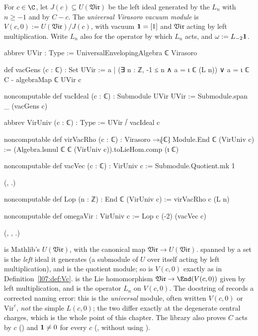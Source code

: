 \begin{definition}\label{l07:def:Vc}
For $c\in\C$, let $J(c)\subseteq U(\mathfrak{Vir})$ be the left ideal generated by the $L_n$ with
$n\ge-1$ and by $C-c$. The \emph{universal Virasoro vacuum module} is $V(c,0) := U(\mathfrak{Vir})/J(c)$,
with vacuum $\mathbf{1} = [1]$ and $\mathfrak{Vir}$ acting by left multiplication. Write $L_n$ also for the
operator by which $L_n$ acts, and $\omega := L_{-2}\mathbf{1}$.
\end{definition}
\begin{leancode}
abbrev UVir : Type := UniversalEnvelopingAlgebra ℂ Virasoro

def vacGens (c : ℂ) : Set UVir :=
  {a | (∃ n : ℤ, -1 ≤ n ∧ a = ι ℂ (L n)) ∨ a = ι ℂ C - algebraMap ℂ UVir c}

noncomputable def vacIdeal (c : ℂ) : Submodule UVir UVir :=
  Submodule.span _ (vacGens c)

abbrev VirUniv (c : ℂ) : Type := UVir ⧸ vacIdeal c

noncomputable def virVacRho (c : ℂ) : Virasoro →ₗ⁅ℂ⁆ Module.End ℂ (VirUniv c) :=
  (Algebra.lsmul ℂ ℂ (VirUniv c)).toLieHom.comp (ι ℂ)

noncomputable def vacVec (c : ℂ) : VirUniv c := Submodule.Quotient.mk 1
\end{leancode}
(, .)
\begin{leancode}
noncomputable def Lop (n : ℤ) : End ℂ (VirUniv c) := virVacRho c (L n)

noncomputable def omegaVir : VirUniv c := Lop c (-2) (vacVec c)
\end{leancode}
(, , .)

\begin{dictionary}
 is Mathlib's $U(\mathfrak{Vir})$, with  the
canonical map $\mathfrak{Vir}\to U(\mathfrak{Vir})$.  spanned by a set is
the \emph{left} ideal it generates (a submodule of $U$ over itself acting by left multiplication),
and  is the quotient module; so  is $V(c,0)$ exactly as in
Definition~\ref{l07:def:Vc}.  is the Lie homomorphism $\mathfrak{Vir}\to\End(V(c,0))$
given by left multiplication, and  is the operator $L_n$ on $V(c,0)$. The
docstring of  records a corrected naming error: this is the \emph{universal} module,
often written $V(c,0)$ or $\mathrm{Vir}^c$, \emph{not} the simple $L(c,0)$; the two differ exactly at
the degenerate central charges, which is the whole point of this chapter. The library also proves
$C$ acts by $c$ () and $\mathbf{1}\neq0$ for every $c$
(, without using ).
\end{dictionary}

